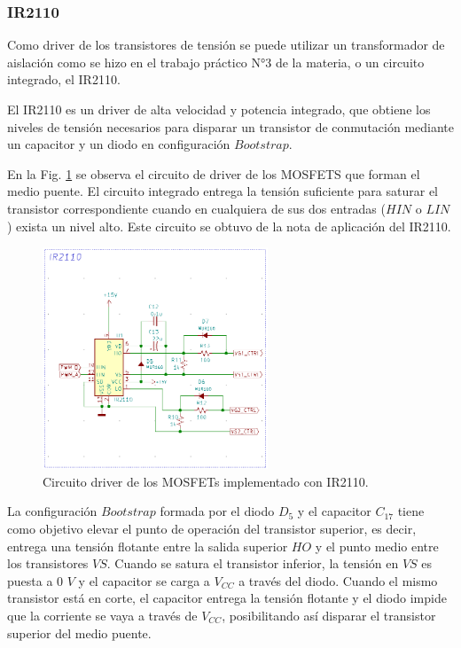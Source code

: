 \documentclass[11pt, a4paper]{article}
\begin{document}
\subsubsection{IR2110}
Como driver de los transistores de tensión se puede utilizar un transformador de aislación como se hizo en el trabajo práctico N°3 de la materia, o un circuito integrado, el IR2110.

El IR2110 es un driver de alta velocidad y potencia integrado, que obtiene los niveles de tensión necesarios para disparar un transistor de conmutación mediante un capacitor y un diodo en configuración $Bootstrap$. 

En la Fig. \ref{driver} se observa el circuito de driver de los MOSFETS que forman el medio puente. El circuito integrado entrega la tensión suficiente para saturar el transistor correspondiente cuando en cualquiera de sus dos entradas ($HIN$ o $LIN$) exista un nivel alto. Este circuito se obtuvo de la nota de aplicación del IR2110.

\begin{figure}[h]
	\centering
	\includegraphics[width = 0.6\textwidth]{Imagenes/driver}
	\caption{Circuito driver de los MOSFETs implementado con IR2110.}
	\label{driver}
\end{figure}

La configuración $Bootstrap$ formada por el diodo $D_5$ y el capacitor $C_{17}$ tiene como objetivo elevar el punto de operación del transistor superior, es decir, entrega una tensión flotante entre la salida superior $HO$ y el punto medio entre los transistores $VS$. Cuando se satura el transistor inferior, la tensión en $VS$ es puesta a $0$ $V$ y el capacitor se carga a $V_{CC}$ a través del diodo. Cuando el mismo transistor está en corte, el capacitor entrega la tensión flotante y el diodo impide que la corriente se vaya a través de $V_{CC}$, posibilitando así disparar el transistor superior del medio puente.
\end{document}
